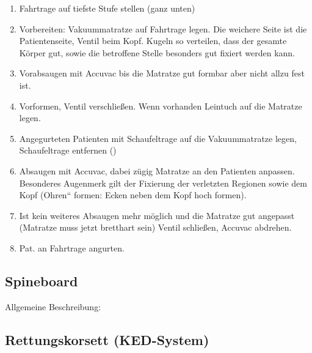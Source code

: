 \begin{enumerate}
    \item Fahrtrage auf tiefste Stufe stellen (ganz unten)
    \item Vorbereiten: Vakuummatratze auf Fahrtrage legen. Die weichere
    Seite ist die Patientenseite, Ventil beim Kopf. Kugeln so verteilen,
    dass der gesamte Körper gut, sowie die betroffene Stelle besonders gut
    fixiert werden kann.
    \item Vorabsaugen mit Accuvac bis die Matratze gut formbar aber nicht allzu
    fest ist.
    \item Vorformen, Ventil verschließen. Wenn vorhanden Leintuch auf
    die Matratze legen.
    \item Angegurteten Patienten mit Schaufeltrage auf die Vakuummatratze
    legen, Schaufeltrage entfernen ()
    \item Absaugen mit Accuvac, dabei zügig Matratze an den Patienten
    anpassen. Besonderes Augenmerk gilt der Fixierung der verletzten
    Regionen sowie dem Kopf ({\quotedblbase}Ohren{\textquotedblleft}
    formen: Ecken neben dem Kopf hoch formen).
    \item Ist kein weiteres Absaugen mehr möglich und die Matratze gut
    angepasst (Matratze muss jetzt bretthart sein) Ventil schließen,
    Accuvac abdrehen.
    \item Pat. an Fahrtrage angurten.
\end{enumerate}

\subsection{Spineboard}
\label{topic:spineboard-anwendung}

Allgemeine Beschreibung:



\clearpage
\subsection{Rettungskorsett (KED-System)}
\label{topic:rettungskorsett-anwendung}

